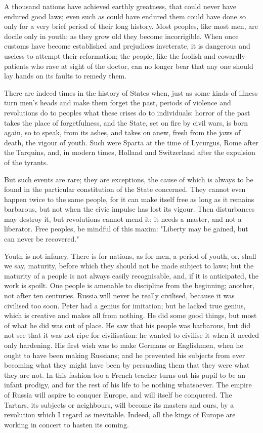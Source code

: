 \documentclass[12pt]{book}
\begin{document}
A thousand nations have achieved earthly greatness, that could never have endured good laws; even such as could have endured them could have done so only for a very brief period of their long history. Most peoples, like most men, are docile only in youth; as they grow old they become incorrigible. When once customs have become established and prejudices inveterate, it is dangerous and useless to attempt their reformation; the people, like the foolish and cowardly patients who rave at sight of the doctor, can no longer bear that any one should lay hands on its faults to remedy them.

There are indeed times in the history of States when, just as some kinds of illness turn men's heads and make them forget the past, periods of violence and revolutions do to peoples what these crises do to individuals: horror of the past takes the place of forgetfulness, and the State, set on fire by civil wars, is born again, so to speak, from its ashes, and takes on anew, fresh from the jaws of death, the vigour of youth. Such were Sparta at the time of Lycurgus, Rome after the Tarquins, and, in modern times, Holland and Switzerland after the expulsion of the tyrants.

But such events are rare; they are exceptions, the cause of which is always to be found in the particular constitution of the State concerned. They cannot even happen twice to the same people, for it can make itself free as long as it remains barbarous, but not when the civic impulse has lost its vigour. Then disturbances may destroy it, but revolutions cannot mend it: it needs a master, and not a liberator. Free peoples, be mindful of this maxim: "Liberty may be gained, but can never be recovered."

Youth is not infancy. There is for nations, as for men, a period of youth, or, shall we say, maturity, before which they should not be made subject to laws; but the maturity of a people is not always easily recognisable, and, if it is anticipated, the work is spoilt. One people is amenable to discipline from the beginning; another, not after ten centuries. Russia will never be really civilised, because it was civilised too soon. Peter had a genius for imitation; but he lacked true genius, which is creative and makes all from nothing. He did some good things, but most of what he did was out of place. He saw that his people was barbarous, but did not see that it was not ripe for civilisation: he wanted to civilise it when it needed only hardening. His first wish was to make Germans or Englishmen, when he ought to have been making Russians; and he prevented his subjects from ever becoming what they might have been by persuading them that they were what they are not. In this fashion too a French teacher turns out his pupil to be an infant prodigy, and for the rest of his life to be nothing whatsoever. The empire of Russia will aspire to conquer Europe, and will itself be conquered. The Tartars, its subjects or neighbours, will become its masters and ours, by a revolution which I regard as inevitable. Indeed, all the kings of Europe are working in concert to hasten its coming.
\end{document}
